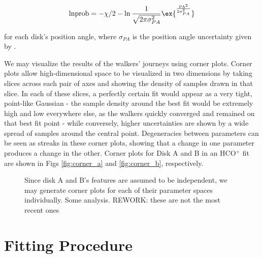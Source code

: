 \begin{align}
  \text{lnprob} = -\chi/2  -\ln{\frac{1}{\sqrt{2 \pi \sigma_{PA}^2}}} \ex{^{\frac{\text{PA}^2}{2 \sigma_{PA}^2}}}
\end{align}

\noindent
for each disk's position angle, where $\sigma_{PA}$ is the position angle uncertainty given by \citet{Williams2014}.



We may visualize the results of the walkers' journeys using corner plots. Corner plots allow high-dimensional space to be visualized in two dimensions by taking slices across each pair of axes and showing the density of samples drawn in that slice. In each of these slices, a perfectly certain fit would appear as a very tight, point-like Gaussian - the sample density around the best fit would be extremely high and low everywhere else, as the walkers quickly converged and remained on that best fit point - while conversely, higher uncertainties are shown by a wide spread of samples around the central point. Degeneracies between parameters can be seen as streaks in these corner plots, showing that a change in one parameter produces a change in the other. Corner plots for Disk A and B in an HCO$^+$ fit are shown in Figs \ref{fig:corner_a} and \ref{fig:corner_b}, respectively.


\begin{figure}[htp]
  \hspace*{\fill}%
  \hfill%
  \hspace*{\fill}%
  \caption{Since disk A and B's features are assumed to be independent, we may generate corner plots for each of their parameter spaces individually. Some analysis. REWORK: these are not the most recent ones}
  \label{fig:corner_plots}
\end{figure}





\section{Fitting Procedure}
\label{section:fitting_procedure}

